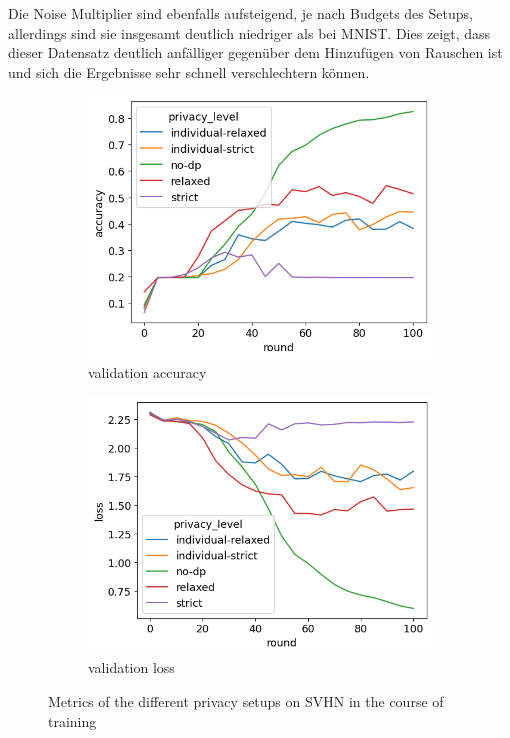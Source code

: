 Die Noise Multiplier sind ebenfalls aufsteigend, je nach Budgets des Setups, allerdings sind sie insgesamt deutlich niedriger als bei MNIST. Dies zeigt, dass dieser Datensatz deutlich anfälliger gegenüber dem Hinzufügen von Rauschen ist und sich die Ergebnisse sehr schnell verschlechtern können.

\begin{figure}
	\centering
	\begin{subfigure}{0.45\textwidth}
		\centering
		\includegraphics[width=\textwidth]{Bilder/svhn-accuracy.png}
		\caption{validation accuracy}
	\end{subfigure}
	\begin{subfigure}{0.45\textwidth}
		\centering
		\includegraphics[width=\textwidth]{Bilder/svhn-loss.png}
		\caption{validation loss}
	\end{subfigure}
	\caption{Metrics of the different privacy setups on SVHN in the course of training}
	\label{fig:fed-svhn-results}
\end{figure}

